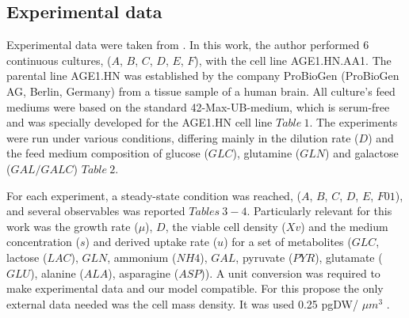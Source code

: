 \subsection{Experimental data} 
	Experimental data were taken from \cite{Rath2017a}. In this work, the author performed 6 continuous cultures, ($A$, $B$, $C$, $D$, $E$, $F$), with the cell line AGE1.HN.AA1. The parental line AGE1.HN was established by the company ProBioGen (ProBioGen AG, Berlin, Germany) from a tissue sample of a human brain. All culture's feed mediums were based on the standard 42-Max-UB-medium, which is serum-free and was specially developed for the AGE1.HN cell line $Table\ 1$. The experiments were run under various conditions, differing mainly in the dilution rate ($D$) and the feed medium composition of glucose ($GLC$), glutamine ($GLN$) and galactose ($GAL/GALC$) $Table\ 2$.
	
	For each experiment, a steady-state condition was reached, ($A$, $B$, $C$, $D$, $E$, $F01$), and several observables  was reported $Tables\ 3-4$. Particularly relevant for this work was the growth rate ($\mu$), $D$, the viable cell density ($Xv$) and the medium concentration ($s$) and derived uptake rate ($u$) for a set of metabolites ($GLC$, lactose ($LAC$), $GLN$, ammonium ($NH4$), $GAL$, pyruvate ($PYR$), glutamate ($GLU$), alanine ($ALA$), asparagine ($ASP$)). A unit conversion was required to make experimental data and our model compatible. For this propose the only external data needed was the cell mass density. It was used  0.25 pgDW/ $\mu$$m^3$ \cite{Niklas2011}.